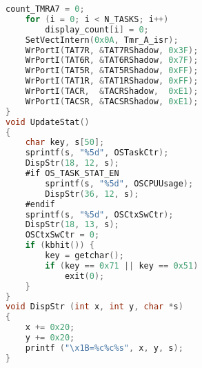 \begin{lstlisting}[language=C]
    count_TMRA7 = 0;
    for (i = 0; i < N_TASKS; i++)
        display_count[i] = 0;
    SetVectIntern(0x0A, Tmr_A_isr);
    WrPortI(TAT7R, &TAT7RShadow, 0x3F);
    WrPortI(TAT6R, &TAT6RShadow, 0x7F);
    WrPortI(TAT5R, &TAT5RShadow, 0xFF);
    WrPortI(TAT1R, &TAT1RShadow, 0xFF);
    WrPortI(TACR,  &TACRShadow,  0xE1);
    WrPortI(TACSR, &TACSRShadow, 0xE1);
}
void UpdateStat()
{
    char key, s[50];
    sprintf(s, "%5d", OSTaskCtr);
    DispStr(18, 12, s);
    #if OS_TASK_STAT_EN
        sprintf(s, "%5d", OSCPUUsage);
        DispStr(36, 12, s);
    #endif
    sprintf(s, "%5d", OSCtxSwCtr);
    DispStr(18, 13, s);
    OSCtxSwCtr = 0;
    if (kbhit()) {
        key = getchar();
        if (key == 0x71 || key == 0x51)
            exit(0);
    }
}
void DispStr (int x, int y, char *s)
{
    x += 0x20;
    y += 0x20;
    printf ("\x1B=%c%c%s", x, y, s);
}
\end{lstlisting}